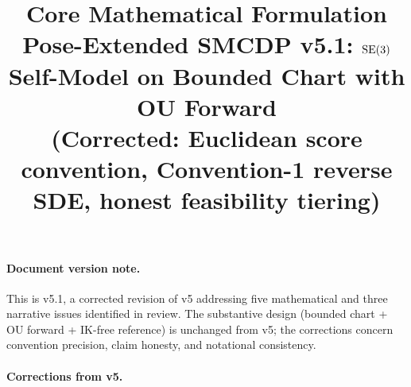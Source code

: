 \documentclass[11pt,a4paper]{article}
\title{Core Mathematical Formulation\\
\large Pose-Extended SMCDP v5.1: $\operatorname{SE}(3)$ Self-Model on Bounded Chart with OU Forward\\
\normalsize (Corrected: Euclidean score convention, Convention-1 reverse SDE, honest feasibility tiering)}
\author{}
\date{}
\begin{document}
\maketitle

\paragraph{Document version note.} This is v5.1, a corrected revision of v5 addressing five mathematical and three narrative issues identified in review. The substantive design (bounded chart + OU forward + IK-free reference) is unchanged from v5; the corrections concern convention precision, claim honesty, and notational consistency.

\paragraph{Corrections from v5.}
\end{document}
